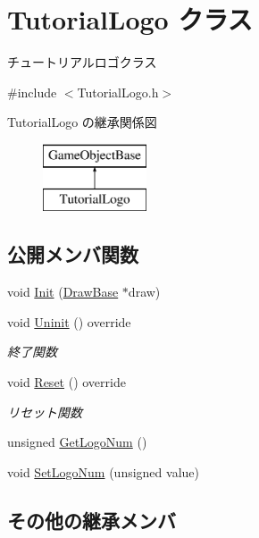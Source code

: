 \hypertarget{class_tutorial_logo}{}\section{Tutorial\+Logo クラス}
\label{class_tutorial_logo}


チュートリアルロゴクラス  




{\ttfamily \#include $<$Tutorial\+Logo.\+h$>$}

Tutorial\+Logo の継承関係図\begin{figure}[H]
\begin{center}
\leavevmode
\includegraphics[height=2.000000cm]{class_tutorial_logo}
\end{center}
\end{figure}
\subsection*{公開メンバ関数}
\begin{DoxyCompactItemize}
\item 
void \mbox{\hyperlink{class_tutorial_logo_a590f017a6b0532d08c1377b90b8fba3f}{Init}} (\mbox{\hyperlink{class_draw_base}{Draw\+Base}} $\ast$draw)
\item 
void \mbox{\hyperlink{class_tutorial_logo_a8e1f1dba47dadf7d1bb40f616324ffb5}{Uninit}} () override
\begin{DoxyCompactList}\small\item\em 終了関数 \end{DoxyCompactList}\item 
void \mbox{\hyperlink{class_tutorial_logo_a2c9e22c81cfeafbd34f50cc766a66cf1}{Reset}} () override
\begin{DoxyCompactList}\small\item\em リセット関数 \end{DoxyCompactList}\item 
unsigned \mbox{\hyperlink{class_tutorial_logo_af4735bb34e06803ff13ae227fcf74e09}{Get\+Logo\+Num}} ()
\item 
void \mbox{\hyperlink{class_tutorial_logo_a18313074bc7242f5e8a9121414abd51d}{Set\+Logo\+Num}} (unsigned value)
\end{DoxyCompactItemize}
\subsection*{その他の継承メンバ}


